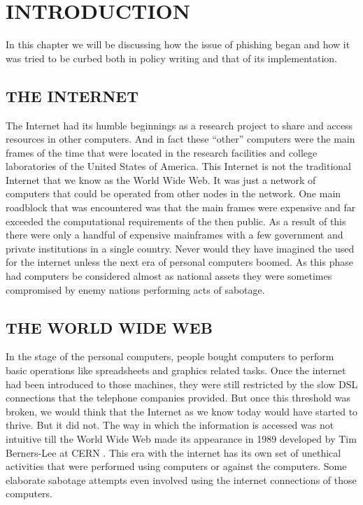 
\chapter{INTRODUCTION} %
In this chapter we will be discussing how the issue of phishing began and how it was tried to be curbed both in policy writing and that of its implementation.

\section{THE INTERNET} %
The Internet had its humble beginnings as a research project to share and access resources in other computers. And in fact these “other” computers were the main frames of the time that were located in the research facilities and college laboratories of the United States of America. This Internet is not the traditional Internet that we know as the World Wide Web. It was just a network of computers that could be operated from other nodes in the network. One main roadblock that was encountered was that the main frames were expensive and far exceeded the computational requirements of the then public. As a result of this there were only a handful of expensive mainframes with a few government and private institutions in a single country. Never would they have imagined the used for the internet unless the next era of personal computers boomed. As this phase had computers be considered almost as national assets they were sometimes compromised by enemy nations performing acts of sabotage\cite{levy}. 

\section{THE WORLD WIDE WEB}
In the stage of the personal computers, people bought computers  to perform basic operations like spreadsheets and graphics related tasks. Once the internet had been introduced to those machines, they were still restricted by the slow DSL connections that the telephone companies provided. But once this threshold was broken, we would think that the Internet as we know today would have started to thrive. But it did not. The way in which the information is accessed was not intuitive till the World Wide Web made its appearance  in 1989 developed by Tim Berners-Lee at CERN \cite{webfoundation}. This era with the internet has its own set of unethical activities that were performed using computers or against the computers. Some elaborate sabotage attempts even involved using the internet connections of those computers.

